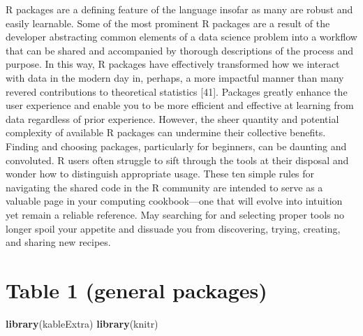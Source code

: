 \documentclass[10pt,letterpaper]{article}
\newenvironment{Shaded}{\begin{snugshade}}{\end{snugshade}}
\newcommand{\KeywordTok}[1]{\textcolor[rgb]{0.13,0.29,0.53}{\textbf{#1}}}
\newcommand{\NormalTok}[1]{#1}
\begin{document}
R packages are a defining feature of the language insofar as many are
robust and easily learnable. Some of the most prominent R packages are a
result of the developer abstracting common elements of a data science
problem into a workflow that can be shared and accompanied by thorough
descriptions of the process and purpose. In this way, R packages have
effectively transformed how we interact with data in the modern day in,
perhaps, a more impactful manner than many revered contributions to
theoretical statistics {[}41{]}. Packages greatly enhance the user
experience and enable you to be more efficient and effective at learning
from data regardless of prior experience. However, the sheer quantity
and potential complexity of available R packages can undermine their
collective benefits. Finding and choosing packages, particularly for
beginners, can be daunting and convoluted. R users often struggle to
sift through the tools at their disposal and wonder how to distinguish
appropriate usage. These ten simple rules for navigating the shared code
in the R community are intended to serve as a valuable page in your
computing cookbook---one that will evolve into intuition yet remain a
reliable reference. May searching for and selecting proper tools no
longer spoil your appetite and dissuade you from discovering, trying,
creating, and sharing new recipes.

\hypertarget{table-1-general-packages}{%
\section{Table 1 (general packages)}\label{table-1-general-packages}}

\begin{Shaded}
\begin{Highlighting}[]
\KeywordTok{library}\NormalTok{(kableExtra)}
\KeywordTok{library}\NormalTok{(knitr)}
\end{Highlighting}
\end{Shaded}
\end{document}
